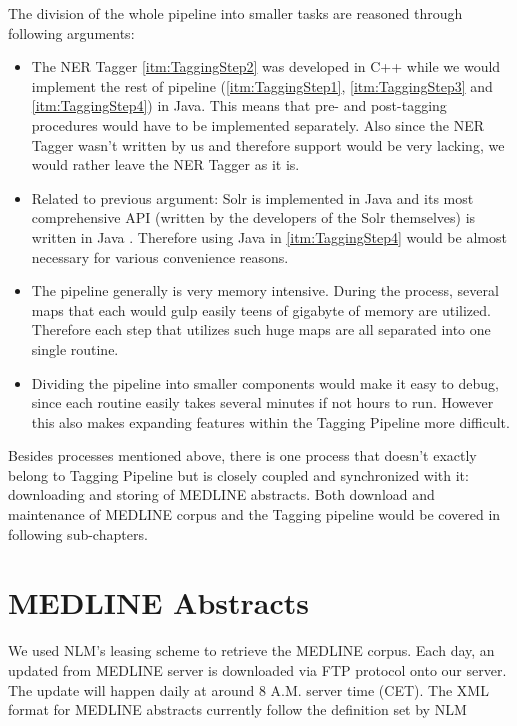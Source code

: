 The division of the whole pipeline into smaller tasks are reasoned through following arguments:
\begin{itemize}
\item The NER Tagger \ref{itm:TaggingStep2} was developed in C++ while we would implement the rest of pipeline (\ref{itm:TaggingStep1}, \ref{itm:TaggingStep3} and \ref{itm:TaggingStep4}) in Java. This means that pre- and post-tagging procedures would have to be implemented separately. Also since the NER Tagger wasn't written by us and therefore support would be very lacking, we would rather leave the NER Tagger as it is.
\item Related to previous argument: Solr is implemented in Java and its most comprehensive API (written by the developers of the Solr themselves) is written in Java \citep{grainger2014solr}. Therefore using Java in \ref{itm:TaggingStep4} would be almost necessary for various convenience reasons.
\item The pipeline generally is very memory intensive. During the process, several maps that each would gulp easily teens of gigabyte of memory are utilized. Therefore each step that utilizes such huge maps are all separated into one single routine.
\item Dividing the pipeline into smaller components would make it easy to debug, since each routine easily takes several minutes if not hours to run. However this also makes expanding features within the Tagging Pipeline more difficult.
\end{itemize}

Besides processes mentioned above, there is one process that doesn't exactly belong to Tagging Pipeline but is closely coupled and synchronized with it: downloading and storing of MEDLINE abstracts. Both download and maintenance of MEDLINE corpus and the Tagging pipeline would be covered in following sub-chapters.


\section{MEDLINE Abstracts}

We used NLM's leasing scheme \citep{MEDLINE} to retrieve the MEDLINE corpus. Each day, an updated from MEDLINE server is downloaded via FTP protocol onto our server. The update will happen daily at around 8 A.M. server time (CET). The XML format for MEDLINE abstracts currently follow the definition set by NLM

